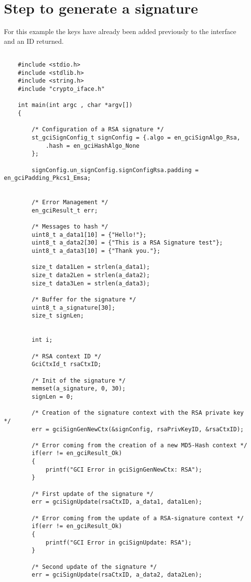 \section{Step to generate a signature}
For this example the keys have already been added previously to the interface 
and an ID returned.
\begin{lstlisting}

	#include <stdio.h>
	#include <stdlib.h>
	#include <string.h>
	#include "crypto_iface.h"

	int main(int argc , char *argv[])
	{

	    /* Configuration of a RSA signature */
	    st_gciSignConfig_t signConfig = {.algo = en_gciSignAlgo_Rsa,
	        .hash = en_gciHashAlgo_None
	    };

	    signConfig.un_signConfig.signConfigRsa.padding = en_gciPadding_Pkcs1_Emsa;


	    /* Error Management */
	    en_gciResult_t err;

	    /* Messages to hash */
	    uint8_t a_data1[10] = {"Hello!"};
	    uint8_t a_data2[30] = {"This is a RSA Signature test"};
	    uint8_t a_data3[10] = {"Thank you."};

	    size_t data1Len = strlen(a_data1);
	    size_t data2Len = strlen(a_data2);
	    size_t data3Len = strlen(a_data3);

	    /* Buffer for the signature */
	    uint8_t a_signature[30];
	    size_t signLen;


	    int i;

	    /* RSA context ID */
	    GciCtxId_t rsaCtxID;

	    /* Init of the signature */
	    memset(a_signature, 0, 30);
	    signLen = 0;

	    /* Creation of the signature context with the RSA private key */
	    err = gciSignGenNewCtx(&signConfig, rsaPrivKeyID, &rsaCtxID);

	    /* Error coming from the creation of a new MD5-Hash context */
	    if(err != en_gciResult_Ok)
	    {
	        printf("GCI Error in gciSignGenNewCtx: RSA");
	    }

	    /* First update of the signature */
	    err = gciSignUpdate(rsaCtxID, a_data1, data1Len);

	    /* Error coming from the update of a RSA-signature context */
	    if(err != en_gciResult_Ok)
	    {
	        printf("GCI Error in gciSignUpdate: RSA");
	    }

	    /* Second update of the signature */
	    err = gciSignUpdate(rsaCtxID, a_data2, data2Len);


\end{lstlisting}
